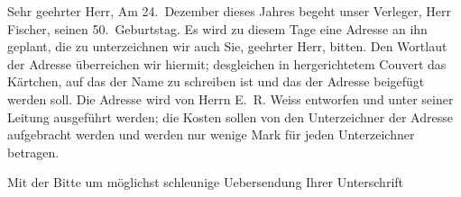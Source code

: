 \pstart{}Sehr geehrter Herr,\pend\vspace{0.5em}
\pstart
           Am 24. Dezember dieses Jahres begeht unser Verleger, Herr Fischer, seinen 50. Geburtstag. Es wird zu
               diesem Tage eine Adresse an ihn geplant, die zu unterzeichnen wir auch Sie, geehrter
               Herr, bitten. Den Wortlaut der Adresse überreichen wir hiermit; desgleichen in
               hergerichtetem Couvert das Kärtchen, auf das der Name zu schreiben ist und das der
               Adresse beigefügt werden soll. Die Adresse wird von Herrn E. R. Weiss entworfen und unter seiner Leitung ausgeführt
               werden; die Kosten sollen von den Unterzeichner der Adresse aufgebracht werden und
               werden nur wenige Mark für jeden Unterzeichner betragen.\pend
           
\pstart
           Mit der Bitte um möglichst schleunige Uebersendung Ihrer Unterschrift\pend
           
